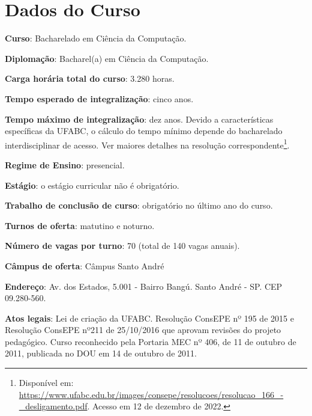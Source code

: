 \section{Dados do Curso}
\label{sec:dados_curso}

\textbf{Curso}: Bacharelado em Ciência da Computação.

\textbf{Diplomação}: Bacharel(a) em Ciência da Computação.

\textbf{Carga horária total do curso}: 3.280 horas.

\textbf{Tempo esperado de integralização}: cinco anos.  

\textbf{Tempo máximo de integralização}: dez anos. Devido a características
específicas da UFABC, o cálculo do tempo mínimo depende do bacharelado
interdisciplinar de acesso. Ver maiores detalhes na resolução
correspondente\footnote{Disponível em:
\url{https://www.ufabc.edu.br/images/consepe/resolucoes/resolucao_166_-_desligamento.pdf}.
Acesso em 12 de dezembro de 2022.}.

\textbf{Regime de Ensino}: presencial.

\textbf{Estágio}: o estágio curricular não é obrigatório.

\textbf{Trabalho de conclusão de curso}: obrigatório no último ano do curso.

\textbf{Turnos de oferta}: matutino e noturno.

\textbf{Número de vagas por turno}: 70 (total de 140 vagas anuais).

\textbf{Câmpus de oferta}: Câmpus Santo André

\textbf{Endereço}: Av. dos Estados, 5.001 - Bairro Bangú. Santo André
- SP. CEP 09.280-560.

\textbf{Atos legais}: Lei de criação da UFABC. Resolução ConsEPE nº
195 de 2015 e Resolução ConsEPE nº211 de 25/10/2016 que aprovam
revisões do projeto pedagógico. Curso reconhecido pela Portaria MEC nº
406, de 11 de outubro de 2011, publicada no DOU em 14 de outubro de
2011.
